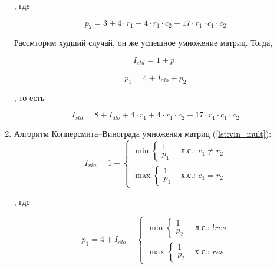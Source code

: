 \begin{enumerate}
    , где

    \begin{equation*}
        p_2 = 3 + 4 \cdot r_1 + 4 \cdot r_1 \cdot c_2 + 17 \cdot r_1 \cdot c_1 \cdot c_2
    \end{equation*}

    Рассмторим худший случай,
    он же успешное умножение матриц.
    Тогда,

    \begin{equation*}
        I_{std} = 1 + p_1
    \end{equation*}

    \begin{equation*}
        p_1 = 4 + I_{alo} + p_2
    \end{equation*}

    , то есть

    \begin{equation*}
        I_{std} = 8 + I_{alo} + 4 \cdot r_1 + 4 \cdot r_1 \cdot c_2 + 17 \cdot r_1 \cdot c_1 \cdot c_2
    \end{equation*}

    \item Алгоритм Копперсмита--Винограда умножения матриц (\ref{lst:vin_mult}):
    \begin{equation*}
        I_{vin} =
        1 +
        \begin{cases}
            \min
            \begin{cases}
                1 \\
                p_1
            \end{cases} & \textit{л.с.: $c_1 \ne r_2$} \\
            \max
            \begin{cases}
                1 \\
                p_1
            \end{cases} & \textit{х.с.: $c_1 = r_2$}
        \end{cases}
    \end{equation*}

    , где

    \begin{equation*}
        p_1 =
        4 + I_{alo} +
        \begin{cases}
            \min
            \begin{cases}
                1 \\
                p_2
            \end{cases} & \textit{л.с.: !res} \\
            \max
            \begin{cases}
                1 \\
                p_2
            \end{cases} & \textit{х.с.: res}
        \end{cases}
    \end{equation*}


\end{enumerate}

